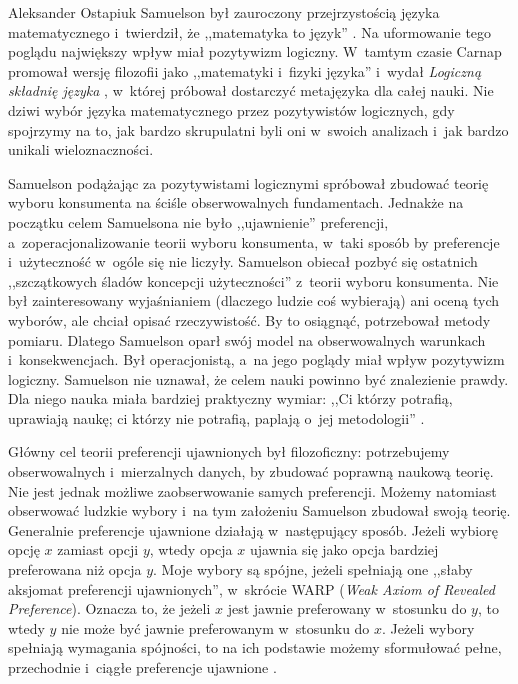 \begin{artplenv}{Aleksander Ostapiuk}
Samuelson był zauroczony przejrzystością języka matematycznego i~twierdził, że ,,matematyka to język''
\parencite[s.~52]{samuelson_economic_1952}.
Na uformowanie tego poglądu największy wpływ miał pozytywizm
logiczny. W~tamtym czasie Carnap promował wersję filozofii jako ,,matematyki i~fizyki języka''
\parencite[s.~180]{richardson_geometry_2003}
i~wydał \textit{Logiczną składnię języka}
\parencite{carnap_logical_1936},
w~której próbował dostarczyć metajęzyka dla całej nauki. Nie dziwi wybór
języka matematycznego przez pozytywistów logicznych, gdy spojrzymy na to, jak bardzo skrupulatni byli oni w~swoich
analizach i~jak bardzo unikali wieloznaczności.

Samuelson
\parencite*{samuelson_note_1938}
podążając za pozytywistami logicznymi spróbował zbudować teorię wyboru
konsumenta na ściśle obserwowalnych fundamentach. Jednakże na początku celem Samuelsona nie było ,,ujawnienie''
preferencji, a~zoperacjonalizowanie teorii wyboru konsumenta, w~taki sposób by 
preferencje i~użyteczność w~ogóle się nie liczyły. Samuelson obiecał pozbyć się ostatnich
,,szczątkowych śladów koncepcji użyteczności''
\parencite[s.~61]{samuelson_note_1938}
z~teorii wyboru konsumenta. Nie był zainteresowany wyjaśnianiem
(dlaczego ludzie coś wybierają) ani oceną tych wyborów, ale chciał opisać rzeczywistość. By to osiągnąć, potrzebował
metody pomiaru. Dlatego Samuelson oparł swój model na obserwowalnych warunkach i~konsekwencjach. Był
operacjonistą, a~na jego poglądy miał wpływ pozytywizm logiczny. Samuelson nie uznawał, że celem nauki
powinno być znalezienie prawdy.
Dla niego nauka miała bardziej praktyczny wymiar: ,,Ci którzy potrafią, uprawiają naukę;
ci którzy nie potrafią, paplają o~jej metodologii''
\parencite[s.~240]{samuelson_my_1992}.

Główny cel teorii preferencji ujawnionych był filozoficzny: potrzebujemy obserwowalnych i~mierzalnych danych, by
zbudować poprawną naukową teorię. Nie jest jednak możliwe zaobserwowanie samych preferencji. Możemy natomiast
obserwować ludzkie wybory i~na tym założeniu Samuelson zbudował swoją teorię. Generalnie preferencje ujawnione działają
w~następujący sposób. Jeżeli wybiorę opcję $x$ zamiast opcji $y$, wtedy opcja $x$ ujawnia się jako
opcja bardziej preferowana niż opcja $y$. Moje wybory są spójne, jeżeli spełniają one ,,słaby aksjomat preferencji
ujawnionych'', w~skrócie WARP (\textit{Weak Axiom of Revealed Preference}). Oznacza to, że jeżeli $x$ jest jawnie
preferowany w~stosunku do $y$, to wtedy $y$ nie może być jawnie preferowanym w~stosunku do $x$.
Jeżeli wybory spełniają wymagania spójności, to na ich podstawie możemy sformułować pełne, przechodnie i~ciągłe
preferencje ujawnione
\parencite{sen_choice_1971,sen_behaviour_1973}.


\end{artplenv}
